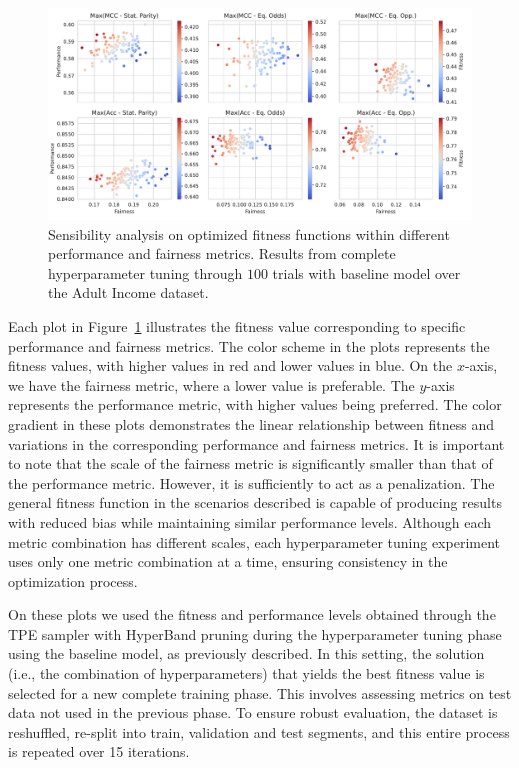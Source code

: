 \begin{figure}[!ht]
\centering
\caption{Sensibility analysis on optimized fitness functions within different performance and fairness metrics. Results from complete hyperparameter tuning through $100$ trials with baseline model over the Adult Income dataset.}
    \label{fig:fitness_sensibility}
    \includegraphics[width=1\linewidth]{images/fitness_sensibility.pdf}
\end{figure}

Each plot in Figure~\ref{fig:fitness_sensibility} illustrates the fitness value corresponding to specific performance and fairness metrics. The color scheme in the plots represents the fitness values, with higher values in red and lower values in blue. On the $x$-axis, we have the fairness metric, where a lower value is preferable. The $y$-axis represents the performance metric, with higher values being preferred. The color gradient in these plots demonstrates the linear relationship between fitness and variations in the corresponding performance and fairness metrics. It is important to note that the scale of the fairness metric is significantly smaller than that of the performance metric. However, it is sufficiently to act as a penalization. The general fitness function in the scenarios described is capable of producing results with reduced bias while maintaining similar performance levels. Although each metric combination has different scales, each hyperparameter tuning experiment uses only one metric combination at a time, ensuring consistency in the optimization process.

On these plots we used the fitness and performance levels obtained through the TPE sampler with HyperBand pruning during the hyperparameter tuning phase using the baseline model, as previously described. In this setting, the solution (i.e., the combination of hyperparameters) that yields the best fitness value is selected for a new complete training phase. This involves assessing metrics on test data not used in the previous phase. To ensure robust evaluation, the dataset is reshuffled, re-split into train, validation and test segments, and this entire process is repeated over 15 iterations.

